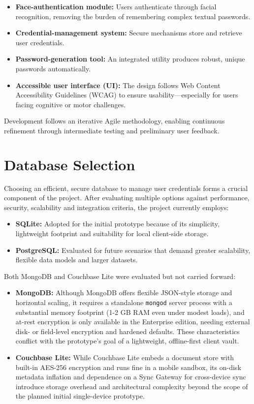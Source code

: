 \begin{itemize}
  \item \textbf{Face-authentication module:} Users authenticate through facial recognition, removing the burden of remembering complex textual passwords.
  \item \textbf{Credential-management system:} Secure mechanisms store and retrieve user credentials.
  \item \textbf{Password-generation tool:} An integrated utility produces robust, unique passwords automatically.
  \item \textbf{Accessible user interface (UI):} The design follows Web Content Accessibility Guidelines (WCAG) to ensure usability—especially for users facing cognitive or motor challenges.
\end{itemize}

Development follows an iterative Agile methodology, enabling continuous refinement through intermediate testing and preliminary user feedback.

\section{Database Selection}
Choosing an efficient, secure database to manage user credentials forms a crucial component of the project. After evaluating multiple options against performance, security, scalability and integration criteria, the project currently employs:

\begin{itemize}
  \item \textbf{SQLite:} Adopted for the initial prototype because of its simplicity, lightweight footprint and suitability for local client-side storage.
  \item \textbf{PostgreSQL:} Evaluated for future scenarios that demand greater scalability, flexible data models and larger datasets.
\end{itemize}

Both MongoDB and Couchbase Lite were evaluated but not carried forward:

\begin{itemize}
  \item \textbf{MongoDB:} Although MongoDB offers flexible JSON-style storage and horizontal scaling, it requires a standalone \texttt{mongod} server process with a substantial memory footprint (1-2 GB RAM even under modest loads), and at-rest encryption is only available in the Enterprise edition, needing external disk- or field-level encryption and hardened defaults. These characteristics conflict with the prototype's goal of a lightweight, offline-first client vault.
  \item \textbf{Couchbase Lite:} While Couchbase Lite embeds a document store with built-in AES-256 encryption and runs fine in a mobile sandbox, its on-disk metadata inflation and dependence on a Sync Gateway for cross-device sync introduce storage overhead and architectural complexity beyond the scope of the planned initial single-device prototype.
\end{itemize}
